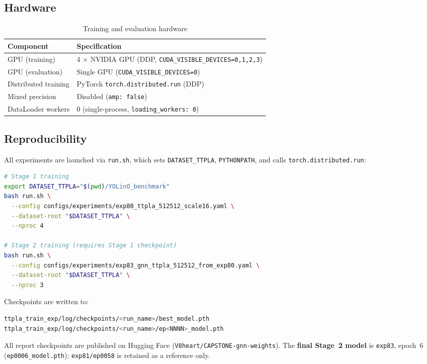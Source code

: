 \documentclass[11pt,a4paper]{article}
\begin{document}
\subsection{Hardware}

\begin{table}[H]
\centering
\caption{Training and evaluation hardware}
\begin{tabular}{ll}
\toprule
Component & Specification \\
\midrule
GPU (training) & 4 $\times$ NVIDIA GPU (DDP, \texttt{CUDA\_VISIBLE\_DEVICES=0,1,2,3}) \\
GPU (evaluation) & Single GPU (\texttt{CUDA\_VISIBLE\_DEVICES=0}) \\
Distributed training & PyTorch \texttt{torch.distributed.run} (DDP) \\
Mixed precision & Disabled (\texttt{amp: false}) \\
DataLoader workers & 0 (single-process, \texttt{loading\_workers: 0}) \\
\bottomrule
\end{tabular}
\end{table}

\subsection{Reproducibility}

All experiments are launched via \texttt{run.sh}, which sets
\texttt{DATASET\_TTPLA}, \texttt{PYTHONPATH}, and calls
\texttt{torch.distributed.run}:

\begin{lstlisting}[language=bash, numbers=none]
# Stage 1 training
export DATASET_TTPLA="$(pwd)/YOLinO_benchmark"
bash run.sh \
  --config configs/experiments/exp80_ttpla_512512_scale16.yaml \
  --dataset-root "$DATASET_TTPLA" \
  --nproc 4

# Stage 2 training (requires Stage 1 checkpoint)
bash run.sh \
  --config configs/experiments/exp83_gnn_ttpla_512512_from_exp80.yaml \
  --dataset-root "$DATASET_TTPLA" \
  --nproc 3
\end{lstlisting}

Checkpoints are written to:
\begin{lstlisting}[language=bash, numbers=none]
ttpla_train_exp/log/checkpoints/<run_name>/best_model.pth
ttpla_train_exp/log/checkpoints/<run_name>/ep<NNNN>_model.pth
\end{lstlisting}

All report checkpoints are published on Hugging Face
(\texttt{V8heart/CAPSTONE-gnn-weights}).
The \textbf{final Stage~2 model} is \texttt{exp83}, epoch~6
(\texttt{ep0006\_model.pth}); \texttt{exp81/ep0058} is retained as a reference only.
\end{document}

